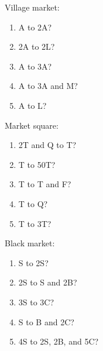 {\normalfont\wedn
Village market:

\begin{enumerate}
\item A to 2A?
\item 2A to 2L?
\item A to 3A?
\item A to 3A and M?
\item A to L?
\end{enumerate}

Market square:

\begin{enumerate}
\item 2T and Q to T?
\item T to 50T?
\item T to T and F?
\item T to Q?
\item T to 3T?
\end{enumerate}

Black market:
\begin{enumerate}
\item S to 2S?
\item 2S to S and 2B?
\item 3S to 3C?
\item S to B and 2C?
\item 4S to 2S, 2B, and 5C?
\end{enumerate}
}

%
